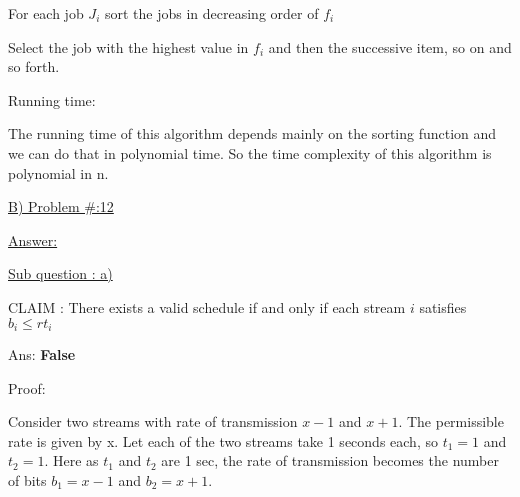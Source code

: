 \documentclass[letterpaper,portrait,12pt]{article}
\begin{document}
\begin{flushleft}
	For each job $J_i$ sort the jobs in decreasing order of $f_i$
\end{flushleft}


\begin{flushleft}
	Select the job with the highest value in $f_i$ and then the successive item, so on and so forth.
\end{flushleft}


\begin{flushleft}
Running time:
\end{flushleft}


\begin{flushleft}
	The running time of this algorithm depends mainly on the sorting function and we can do that in polynomial time. So the time complexity of this algorithm is polynomial in n. 
\end{flushleft}


\begin{flushleft}

\end{flushleft}


\begin{flushleft}
\uline{B)}\uline{ Pro}\uline{blem }\uline{\#:12}
\end{flushleft}


\begin{flushleft}
\uline{Ans}\uline{wer:}
\end{flushleft}


\begin{flushleft}

\end{flushleft}


\begin{flushleft}
\uline{Sub q}\uline{uestion }\uline{: }\uline{a)}
\end{flushleft}


\begin{flushleft}
CLAIM : There exists a valid schedule if and only if each stream $i$ satisfies $b_i \le rt_i$
\end{flushleft}


\begin{flushleft}
Ans: \textbf{False}
\end{flushleft}


\begin{flushleft}
Proof: 
\end{flushleft}


\begin{flushleft}
Consider two streams with rate of transmission $x-1$ and $x+1$. The permissible rate is given by x. Let each of the two streams take 1 seconds each, so $t_1=1$ and $t_2=1$. Here as $t_1 $ and $t_2$ are 1 sec, the rate of transmission becomes the number of bits $b_1 = x-1$ and $b_2 = x+1$.
\end{flushleft}
\end{document}
